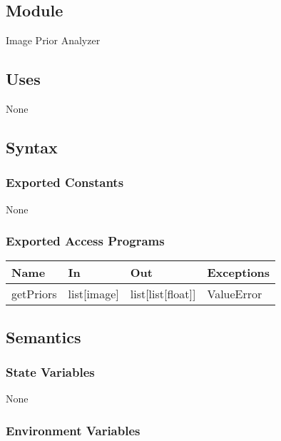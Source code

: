 \documentclass[12pt, titlepage]{article}
\begin{document}
  
  
  \subsection{Module}
  
  Image Prior Analyzer
  
  \subsection{Uses}
  
  None

  \subsection{Syntax}


  
  \subsubsection{Exported Constants}
  None
  \subsubsection{Exported Access Programs}
  
  \begin{center}
  \begin{tabular}{p{2cm} p{4cm} p{4cm} p{2cm}}
  \hline
  \textbf{Name} & \textbf{In} & \textbf{Out} & \textbf{Exceptions} \\
  \hline
  getPriors & list[image] & list[list[float]]  & ValueError \\
  
  \end{tabular}
  \end{center}
  
  \subsection{Semantics}
  
  \subsubsection{State Variables}
  
 None
  
  \subsubsection{Environment Variables}
  
\end{document}
